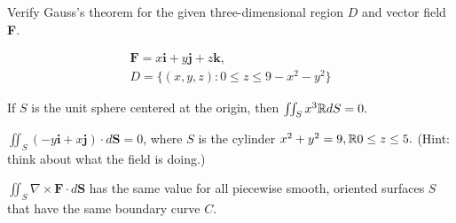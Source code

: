 \documentclass[11pt,letterpaper,boxed]{pset}
\newcommand{\B}[1]{\textbf{#1}}
\def \S {\R{ }}
\begin{document}
\begin{problem} [7.3.6]
	Verify Gauss’s theorem for the given three-dimensional region $D$ and vector field \B{F}.
    
    \begin{gather*}
        \B{F} = x \B{i} + y \B{j} + z \B{k}, \\
	    D = \{(x,y,z) : 0 \leq z \leq 9 - x^2 - y^2\}
    \end{gather*}
\end{problem}
\newpage


\begin{problem} [7.(T/F).6]
	If $S$ is the unit sphere centered at the origin, then $\iint_S x^3 \S dS = 0.$
\end{problem}
\vspace{.2\paperheight}

\begin{problem} [7.(T/F).10]
	$\iint_S (-y\B{i} + x\B{j}) \cdot d\B{S} = 0$, where $S$ is the cylinder $x^2+y^2=9, \S 0 \leq z \leq 5.$
	(Hint: think about what the field is doing.)

\end{problem}
\vspace{.2\paperheight}


\begin{problem} [7.(T/F).18]
	$\iint_S \nabla \times \B{F} \cdot d \B{S}$ has the same value for all piecewise smooth, oriented surfaces $S$ that have the same boundary curve $C$.
\end{problem}
\vspace{.2\paperheight}
\newpage
\end{document}
